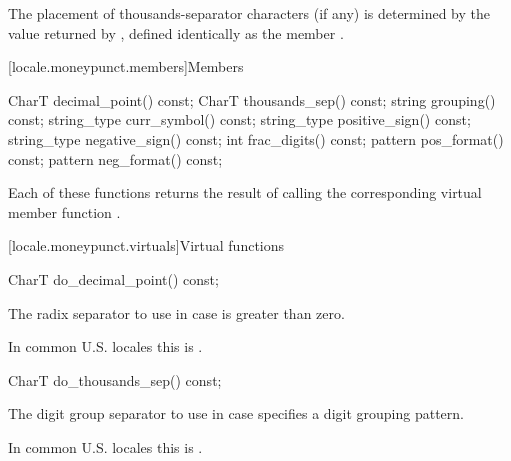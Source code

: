 \pnum
The placement of thousands-separator characters (if any)
is determined by the value returned by ,
defined identically as the member .

[locale.moneypunct.members]{Members}

%
%
%
%
%
%
%
%
%
\begin{codeblock}
CharT       decimal_point() const;
CharT       thousands_sep() const;
string      grouping()      const;
string_type curr_symbol()   const;
string_type positive_sign() const;
string_type negative_sign() const;
int         frac_digits()   const;
pattern     pos_format()    const;
pattern     neg_format()    const;
\end{codeblock}

\pnum
Each of these functions 
returns the result of calling the corresponding
virtual member function
.

[locale.moneypunct.virtuals]{Virtual functions}

%
\begin{itemdecl}
CharT do_decimal_point() const;
\end{itemdecl}

\begin{itemdescr}
\pnum
\returns
The radix separator to use
in case  is greater than zero.
\begin{footnote}
In common U.S. locales this is .
\end{footnote}
\end{itemdescr}

%
\begin{itemdecl}
CharT do_thousands_sep() const;
\end{itemdecl}

\begin{itemdescr}
\pnum
\returns
The digit group separator to use
in case  specifies a digit grouping pattern.
\begin{footnote}
In common U.S. locales this is .
\end{footnote}
\end{itemdescr}

